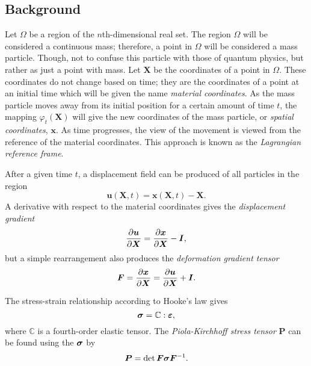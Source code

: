 \subsection{Background}
Let $\Omega$ be a region of the $n$th-dimensional real set. The region $\Omega$ will be considered a continuous mass; therefore, a point in $\Omega$ will be considered a mass particle. Though, not to confuse this particle with those of quantum physics, but rather as just a point with mass. Let $\bm{X}$ be the coordinates of a point in $\Omega$. These coordinates do not change based on time; they are the coordinates of a point at an initial time which will be given the name \textit{material coordinates}. As the mass particle moves away from its initial position for a certain amount of time $t$, the mapping $\varphi_t(\bm{X})$ will give the new coordinates of the mass particle, or \textit{spatial coordinates}, $\bm{x}$. As time progresses, the view of the movement is viewed from the reference of the material coordinates. This approach is known as the \textit{Lagrangian reference frame}.

After a given time $t$, a displacement field can be produced of all particles in the region
\begin{equation}
  \bm{u}(\bm{X},t) = \bm{x}(\bm{X},t) - \bm{X}.
\end{equation}
A derivative with respect to the material coordinates gives the \textit{displacement gradient}
\begin{equation}
  \frac{\partial\bm{u}}{\partial\bm{X}} = \frac{\partial\bm{x}}{\partial\bm{X}} - \bm{I},
\end{equation}
but a simple rearrangement also produces the \textit{deformation gradient tensor}
\begin{equation}
  \bm{F} = \frac{\partial\bm{x}}{\partial\bm{X}} = \frac{\partial\bm{u}}{\partial\bm{X}} + \bm{I}.
\end{equation}

The stress-strain relationship according to Hooke's law gives
\begin{equation}
  \label{eq::Hookes_Law}
  \bm{\sigma} = \mathbb{C}:\bm{\varepsilon},
\end{equation}
where $\mathbb{C}$ is a fourth-order elastic tensor. The \textit{Piola-Kirchhoff stress tensor} $\bm{P}$ can be found using the  $\bm{\sigma}$ by
\begin{equation}
  \bm{P} = \det{\bm{F}}\bm{\sigma}\bm{F}^{-1}.
\end{equation}
